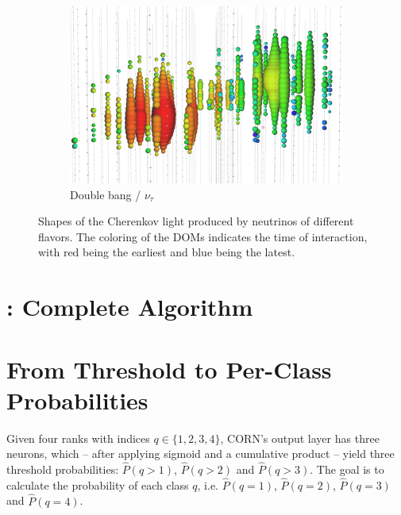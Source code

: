 \begin{figure}
\begin{subfigure}{0.3\textwidth}
    \centering
    \includegraphics[width=\textwidth]{content/img/signatures/double_bang.png}
    \caption{
        Double bang / $\nu_\tau$
    }
  \end{subfigure}
  \caption{
    Shapes of the Cherenkov light produced by neutrinos of different flavors.
    The coloring of the \acp{DOM} indicates the time of interaction,
    with red being the earliest and blue being the latest.
    \cite{kowalski2017} %
  }
  \label{fig:img:icecube:interactions}
\end{figure}


\clearpage
\section{\dseaplustitle{}: Complete Algorithm} \label{sec:alg:dseaplus}



\clearpage
\section{From Threshold to Per-Class Probabilities}
\label{sec:appendix:corn_probas}
\renewcommand{\myP}{\hat{P}} %
Given four ranks with indices $q \in \{1, 2, 3, 4\}$,
\Ac{CORN}'s output layer has three neurons, which
  – after applying sigmoid and a cumulative product –
yield three threshold probabilities:
	$\myP(q>1)$,
	$\myP(q>2)$ and
	$\myP(q>3)$.
The goal is to calculate the probability of each class $q$,
i.e. $\myP(q=1)$, $\myP(q=2)$, $\myP(q=3)$ and $\myP(q=4)$.

